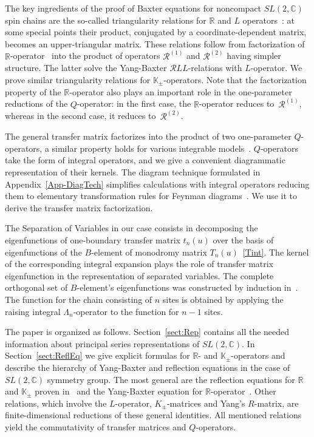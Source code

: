 \documentclass[a4paper,11pt]{article}
\numberwithin{equation}{section}
\begin{document}
The key ingredients of the proof of Baxter equations for noncompact $SL(2,\mathbb{C})$ spin chains are the so-called triangularity relations for $\mathbb{R}$ and $L$ operators~\cite{Derkachov:2005fg}: at some special points their product, conjugated by a coordinate-dependent matrix, becomes an upper-triangular matrix.
These relations follow from factorization of $\mathbb{R}$-operator~\cite{Derkachov:2005hw,DM09} into the product of operators $\mathcal{R}^{(1)}$ and $\mathcal{R}^{(2)}$ having simpler structure.
The latter solve the Yang-Baxter $\mathcal{R}LL$-relations with $L$-operator.
We prove similar triangularity relations for $\mathbb{K}_\pm$-operators.
Note that the factorization property of the $\mathbb{R}$-operator also plays an important role in the one-parameter reductions of the $Q$-operator: in the first case, the $\mathbb{R}$-operator reduces to~$\mathcal{R}^{(1)}$, whereas in the second case, it reduces to~$\mathcal{R}^{(2)}$.

The general transfer matrix factorizes into the product of two one-parameter $Q$-operators, a similar property holds for various integrable models~\cite{BLZ,AF,DKM}.
$Q$-operators take the form of integral operators, and we give a convenient diagrammatic representation of their kernels.
The diagram technique formulated in Appendix~\ref{App-DiagTech} simplifies calculations with integral operators reducing them to elementary transformation rules for Feynman diagrams~\cite{DKM,DM14,DM:Gust3,DKM3,DKM2}.
We use it to derive the transfer matrix factorization.

The Separation of Variables in our case consists in decomposing the eigenfunctions of one-boundary transfer matrix $t_n(u)$ over the basis of eigenfunctions of the $B$-element of monodromy matrix $T_n(u)$~\eqref{Tint}.
The kernel of the corresponding integral expansion plays the role of transfer matrix eigenfunction in the representation of separated variables.
The complete orthogonal set of $B$-element's eigenfunctions was constructed by induction in~\cite{ADV2}.
The function for the chain consisting of $n$ sites is obtained by applying the raising integral $\Lambda_n$-operator to the function for $n-1$ sites.

The paper is organized as follows. Section~\ref{sect:Rep} contains all the needed information about principal series representations of $SL(2,\mathbb{C})$.
In Section~\ref{sect:ReflEq} we give explicit formulas for $\mathbb{R}$- and $\mathbb{K}_\pm$-operators and describe the hierarchy of Yang-Baxter and reflection equations in the case of $SL(2,\mathbb{C})$ symmetry group.
The most general are the reflection equations for $\mathbb{R}$ and $\mathbb{K}_\pm$ proven in~\cite{ADV2} and the Yang-Baxter equation for $\mathbb{R}$-operator~\cite{DKM,DM09}.
Other relations, which involve the $L$-operator, $K_\pm$-matrices and Yang's $R$-matrix, are finite-dimensional reductions of these general identities.
All mentioned relations yield the commutativity of transfer matrices and $Q$-operators.
\end{document}
